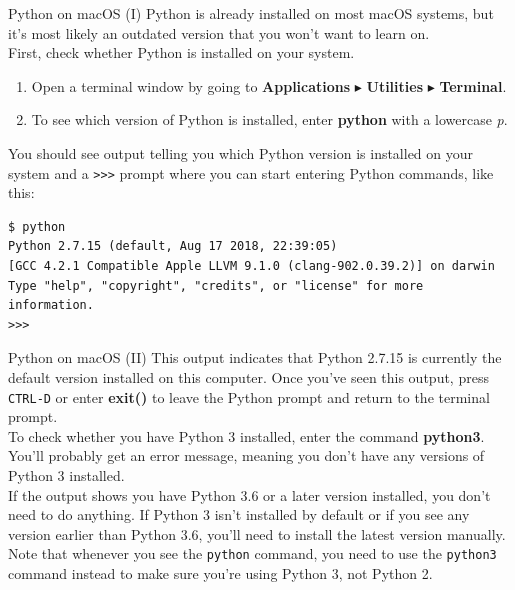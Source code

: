 \documentclass[aspectratio=169]{beamer}
\begin{document}
\begin{frame}[fragile]{Python on macOS (I)}
    Python is already installed on most macOS systems, but it's most likely an outdated version that you won't want to learn on. \\
    \vspace{10pt}
    First, check whether Python is installed on your system.
        \begin{enumerate}[label={\arabic*.},itemsep=5pt]
            \item Open a terminal window by going to \textbf{Applications} \(\blacktriangleright\) \textbf{Utilities} \(\blacktriangleright\) \textbf{Terminal}.
            \item To see which version of Python is installed, enter \textbf{python} with a lowercase \textit{p}.
        \end{enumerate}
    \vspace{10pt}
    You should see output telling you which Python version is installed on your system and a \verb|>>>| prompt where you can start entering Python commands, like this:
    \vspace{5pt}
    \begin{Verbatim}[fontsize=\footnotesize]
$ python
Python 2.7.15 (default, Aug 17 2018, 22:39:05)
[GCC 4.2.1 Compatible Apple LLVM 9.1.0 (clang-902.0.39.2)] on darwin
Type "help", "copyright", "credits", or "license" for more information.
>>>
    \end{Verbatim}
\end{frame}


\begin{frame}[fragile]{Python on macOS (II)}
    This output indicates that Python 2.7.15 is currently the default version installed on this computer.
    Once you've seen this output, press \texttt{CTRL-D} or enter \textbf{exit()} to leave the Python prompt and return to the terminal prompt. \\
    \vspace{10pt}
    To check whether you have Python 3 installed, enter the command \textbf{python3}.
    You'll probably get an error message, meaning you don't have any versions of Python 3 installed. \\
    \vspace{10pt}
    If the output shows you have Python 3.6 or a later version installed, you don't need to do anything.
    If Python 3 isn't installed by default or if you see any version earlier than Python 3.6, you'll need to install the latest version manually. \\
    \vspace{10pt}
    Note that whenever you see the \texttt{python} command, you need to use the \texttt{python3} command instead to make sure you're using Python 3, not Python 2.
\end{frame}
\end{document}
